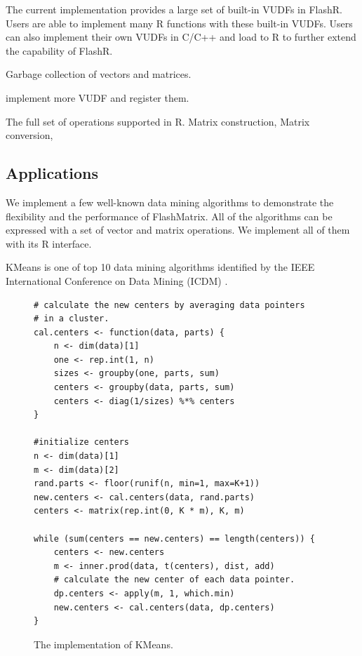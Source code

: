 The current implementation provides a large set of built-in VUDFs in FlashR.
Users are able to implement many R functions with these built-in VUDFs.
Users can also implement their own VUDFs in C/C++ and load to R to further
extend the capability of FlashR.

Garbage collection of vectors and matrices.

implement more VUDF and register them.

The full set of operations supported in R.
Matrix construction,
Matrix conversion,

\subsection{Applications}

We implement a few well-known data mining algorithms to demonstrate
the flexibility and the performance of FlashMatrix. All of the algorithms
can be expressed with a set of vector and matrix operations. We implement
all of them with its R interface.

KMeans is one of top 10 data mining algorithms identified by the IEEE
International Conference on Data Mining (ICDM) \cite{top10}.

\begin{figure}[t]
\begin{verbatim}
# calculate the new centers by averaging data pointers
# in a cluster.
cal.centers <- function(data, parts) {
	n <- dim(data)[1]
	one <- rep.int(1, n)
	sizes <- groupby(one, parts, sum)
	centers <- groupby(data, parts, sum)
	centers <- diag(1/sizes) %*% centers
}

#initialize centers
n <- dim(data)[1]
m <- dim(data)[2]
rand.parts <- floor(runif(n, min=1, max=K+1))
new.centers <- cal.centers(data, rand.parts)
centers <- matrix(rep.int(0, K * m), K, m)

while (sum(centers == new.centers) == length(centers)) {
	centers <- new.centers
	m <- inner.prod(data, t(centers), dist, add)
	# calculate the new center of each data pointer.
	dp.centers <- apply(m, 1, which.min)
	new.centers <- cal.centers(data, dp.centers)
}
\end{verbatim}
\vspace{-5pt}
\caption{The implementation of KMeans.}
\label{fig:kmeans}
\end{figure}

